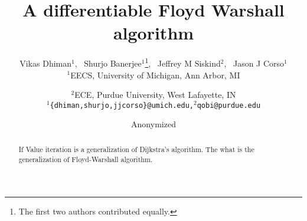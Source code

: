 \documentclass{article} %
\title{A differentiable Floyd Warshall algorithm}
\author{Vikas Dhiman$^1$\footnotemark[1],%
  \, Shurjo Banerjee$^1$\thanks{The first two authors contributed equally.},%
  \, Jeffrey M Siskind$^2$,%
  \, Jason J Corso$^1$\\
$^1$EECS, University of Michigan,
Ann Arbor, MI
\and
$^2$ECE, Purdue University,
West Lafayette, IN\\
\texttt{$^1$\{dhiman,shurjo,jjcorso\}@umich.edu,$^2$qobi@purdue.edu} \\
}
\author{Anonymized}
\begin{document}
\maketitle
\begin{abstract}
  If Value iteration is a generalization of Dijkstra's algorithm.
  The what is the generalization of Floyd-Warshall algorithm.
\end{abstract}



{\small
{}

}
\end{document}
